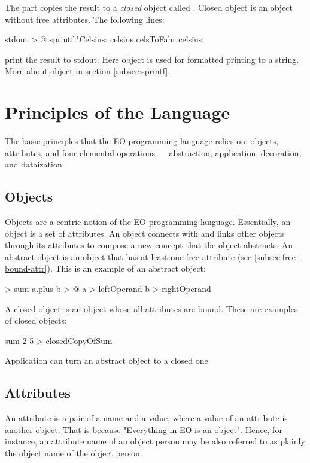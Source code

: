 \documentclass[12pt]{book}
\begin{document}
The  part copies the result to a \textit{closed} object called . Closed object is an object without free attributes. The following lines: 
\begin{ffcode}
stdout > @
  sprintf
    "Celsius: %
    celsius
    celsToFahr celsius
\end{ffcode}
print the result to stdout. Here  object is used for formatted printing to a string. More about  object in section \ref{subsec:sprintf}.

\chapter{Principles of the Language}
The basic principles that the EO programming language relies on: objects, attributes, and four elemental operations — abstraction, application, decoration, and dataization. 

\section{Objects} \label{sec:objects}
Objects are a centric notion of the EO programming language. Essentially, an object is a set of attributes. An object connects with and links other objects through its attributes to compose a new concept that the object abstracts.
An abstract object is an object that has at least one free attribute (see \ref{subsec:free-bound-attr}).
This is an example of an abstract object:

\begin{ffcode}
[a b] > sum
  a.plus b > @
  a > leftOperand
  b > rightOperand
\end{ffcode}
A closed object is an object whose all attributes are bound.
These are examples of closed objects:

\begin{ffcode}
sum 2 5 > closedCopyOfSum
\end{ffcode}
Application can turn an abstract object to a closed one


\section{Attributes}
An attribute is a pair of a name and a value, where a value of an attribute is another object. That is because "Everything in EO is an object". Hence, for instance, an attribute name of an object person may be also referred to as plainly the object name of the object person.
\end{document}
